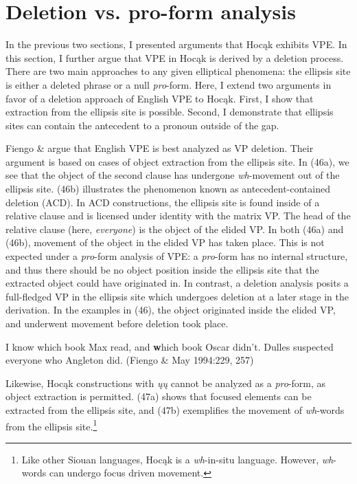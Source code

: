 \documentclass[output=paper]{LSP/langsci}
\begin{document}
\section{Deletion vs. pro-form analysis}

In the previous two sections, I presented arguments that Hocąk exhibits VPE. In this section, I further argue that VPE in Hocąk is derived by a deletion process. There are two main approaches to any given elliptical phenomena: the ellipsis site is either a deleted phrase or a null \emph{pro}-form. Here, I extend two arguments in favor of a deletion approach of English VPE to Hocąk. First, I show that extraction from the ellipsis site is possible. Second, I demonstrate that ellipsis sites can contain the antecedent to a pronoun outside of the gap.

Fiengo \& \citet{May1994} argue that English VPE is best analyzed as VP deletion. Their argument is based on cases of object extraction from the ellipsis site. In (46a), we see that the object of the second clause has undergone \emph{wh}-movement out of the ellipsis site. (46b) illustrates the phenomenon known as antecedent-contained deletion (ACD). In ACD constructions, the ellipsis site is found inside of a relative clause and is licensed under identity with the matrix VP. The head of the relative clause (here, \emph{everyone}) is the object of the elided VP. In both (46a) and (46b), movement of the object in the elided VP has taken place. This is not expected under a \emph{pro}-form analysis of VPE: a \emph{pro}-form has no internal structure, and thus there should be no object position inside the ellipsis site that the extracted object could have originated in. In contrast, a deletion analysis posits a full-fledged VP in the ellipsis site which undergoes deletion at a later stage in the derivation. In the examples in (46), the object originated inside the elided VP, and underwent movement before deletion took place.

\begin{exe}
\ex
\begin{xlist}
\ex
I know which book Max read, and {\textbf which book} Oscar didn't.
\ex
Dulles suspected everyone who Angleton did. (Fiengo \& May 1994:229, 257)
\end{xlist}
\end{exe}

Likewise, Hocąk constructions with \emph{ųų} cannot be analyzed as a \emph{pro}-form, as object extraction is permitted. (47a) shows that focused elements can be extracted from the ellipsis site, and (47b) exemplifies the movement of \emph{wh}-words from the ellipsis site.\footnote{Like other Siouan languages, Hocąk is a \emph{wh}-in-situ language. However, \emph{wh}-words can undergo focus driven movement.}
\end{document}
